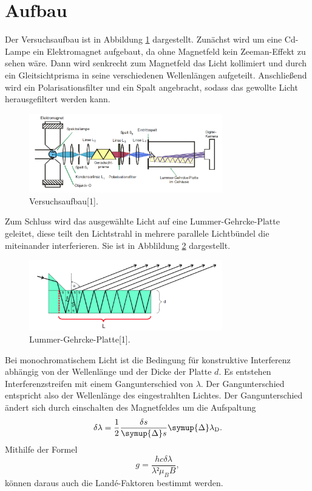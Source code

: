 \section{Aufbau}

Der Versuchsaufbau ist in Abbildung \ref{fig:aufb} dargestellt. Zunächst wird um eine Cd-Lampe ein 
Elektromagnet aufgebaut, da ohne Magnetfeld kein Zeeman-Effekt zu sehen wäre.
Dann wird senkrecht zum Magnetfeld das Licht kollimiert und durch ein Gleitsichtprisma in seine verschiedenen 
Wellenlängen aufgeteilt. Anschließend wird ein Polarisationsfilter und ein Spalt angebracht, sodass das 
gewollte Licht herausgefiltert werden kann. 

\begin{figure}
  \centering
  \includegraphics[width=0.75\textwidth]{aufbau.png}
  \caption{Versuchsaufbau[1].}
  \label{fig:aufb}
\end{figure}
\FloatBarrier

Zum Schluss wird das ausgewählte Licht auf eine Lummer-Gehrcke-Platte geleitet, diese teilt den Lichtstrahl 
in mehrere parallele Lichtbündel die miteinander interferieren. 
Sie ist in Abblildung \ref{fig:pl} dargestellt. 

\begin{figure}
  \centering
  \includegraphics[width=0.75\textwidth]{platte.png}
  \caption{Lummer-Gehrcke-Platte[1].}
  \label{fig:pl}
\end{figure}
\FloatBarrier

Bei monochromatischem Licht ist die Bedingung für konstruktive Interferenz abhängig von der Wellenlänge und 
der Dicke der Platte $d$. Es entstehen Interferenzstreifen mit einem Gangunterschied von $\lambda$. 
Der Gangunterschied entspricht also der Wellenlänge des eingestrahlten Lichtes. Der Gangunterschied ändert sich durch  
einschalten des Magnetfeldes um die Aufspaltung 
\begin{equation}
  \delta \lambda = \frac{1}{2} \frac{\delta s}{\symup{\Delta}s} \symup{\Delta}\lambda_{\si{D}}.
  \label{dl}
\end{equation}
Mithilfe der Formel 
\begin{equation}
  g = \frac{h c \delta \lambda}{\lambda² \mu_B B},
  \label{eqn:g}
\end{equation}
können daraus auch die Landé-Faktoren bestimmt werden.

